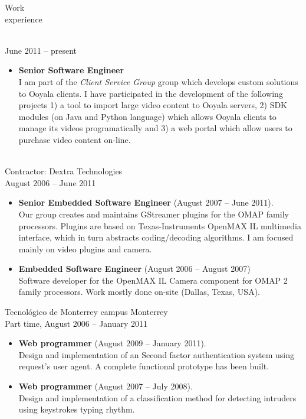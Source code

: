 \documentclass{resume}
\def\itesm{Tecnol\'ogico de Monterrey campus Monterrey}
\begin{document}
\begin{category}{Work \\experience}

\\
 June 2011 -- present
\begin{itemize}
\item \textbf{Senior Software Engineer}\\
I am part of the \textit{Client Service Group} group which develops custom solutions to Ooyala clients. I have participated in the development of
the following projects 1) a tool to import large video content to Ooyala servers, 2) SDK modules (on Java and Python language) which 
allows Ooyala clients to manage its videos programatically and 3) a web portal which allow users to purchase video content on-line. 
\end{itemize}

\\
Contractor: Dextra Technologies\\
August 2006 -- June 2011
\begin{itemize}
\item \textbf{Senior Embedded Software Engineer} (August 2007 -- June 2011).\\
Our group creates and maintains GStreamer plugins for the OMAP family processors. Plugins are based on Texas-Instruments OpenMAX IL multimedia interface,
which in turn abstracts coding/decoding algorithms. I am focused mainly on video plugins and camera.\\
\item \textbf{Embedded Software Engineer} (August 2006 -- August 2007)\\
Software developer for the OpenMAX IL Camera component for OMAP 2 family processors. Work mostly done on-site (Dallas, Texas, USA).\\
\end{itemize}

\citem\itesm\\
Part time, August 2006 -- January 2011
\begin{itemize}
\item \textbf{Web programmer} (August 2009 -- January 2011).\\
Design and implementation of an Second factor authentication system using request's user agent. A complete functional prototype has been built.
\item \textbf{Web programmer} (August 2007 -- July 2008).\\
Design and implementation of a classification method for detecting intruders using keystrokes typing rhythm.
\end{itemize}
\end{category}
\end{document}
